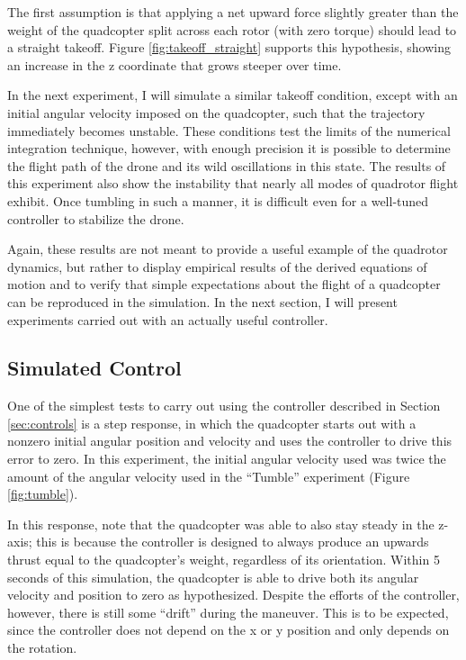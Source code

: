 \documentclass{article}
\begin{document}
The first assumption is that applying a net upward force slightly greater than the weight of the quadcopter split across each rotor (with zero torque) should lead to a straight takeoff. Figure \ref{fig:takeoff_straight} supports this hypothesis, showing an increase in the z coordinate that grows steeper over time.


In the next experiment, I will simulate a similar takeoff condition, except with an initial angular velocity imposed on the quadcopter, such that the trajectory immediately becomes unstable. These conditions test the limits of the numerical integration technique, however, with enough precision it is possible to determine the flight path of the drone and its wild oscillations in this state. The results of this experiment also show the instability that nearly all modes of quadrotor flight exhibit. Once tumbling in such a manner, it is difficult even for a well-tuned controller to stabilize the drone.


Again, these results are not meant to provide a useful example of the quadrotor dynamics, but rather to display empirical results of the derived equations of motion and to verify that simple expectations about the flight of a quadcopter can be reproduced in the simulation. In the next section, I will present experiments carried out with an actually useful controller.

\subsection{Simulated Control}

One of the simplest tests to carry out using the controller described in Section \ref{sec:controls} is a step response, in which the quadcopter starts out with a nonzero initial angular position and velocity and uses the controller to drive this error to zero. In this experiment, the initial angular velocity used was twice the amount of the angular velocity used in the ``Tumble'' experiment (Figure \ref{fig:tumble}).


In this response, note that the quadcopter was able to also stay steady in the z-axis; this is because the controller is designed to always produce an upwards thrust equal to the quadcopter's weight, regardless of its orientation. Within 5 seconds of this simulation, the quadcopter is able to drive both its angular velocity and position to zero as hypothesized. Despite the efforts of the controller, however, there is still some ``drift'' during the maneuver. This is to be expected, since the controller does not depend on the x or y position and only depends on the rotation.
\end{document}
